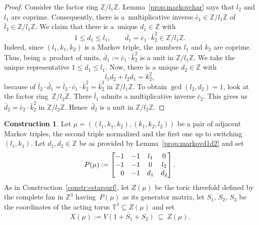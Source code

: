 \documentclass[10pt,a4paper]{amsart}
\theoremstyle{definition}
\newtheorem{constr}[thm]{Construction}
\def\TT{{\mathbb T}}
\def\ZZ{{\mathbb Z}}
\begin{document}
\begin{proof}
Consider the factor ring $\ZZ / l_1\ZZ$.
Lemma~\ref{prop:markovchar} says that
$l_2$ and $l_1$ are coprime.
Consequently, there is a~multiplicative inverse
$\bar c_1 \in \ZZ / l_1\ZZ$ of $\bar l_2 \in \ZZ / l_1\ZZ$.
We claim that there is a~unique $d_1 \in \ZZ$ with
\[
1 \le d_1 \le l_1,
\qquad
\bar d_1 = \bar c_1 \cdot \bar k_2^2 \in \ZZ / l_1\ZZ.
\]
Indeed, since $(l_1,k_1,k_2)$ is a Markov triple,
the numbers $l_1$ and $k_2$ are coprime.
Thus, being a~product of units,
$\bar d_1 := \bar c_1 \cdot \bar k_2^2$
is a unit in $\ZZ / l_1\ZZ$.
We take the unique representative $1 \le d_1 \le l_1$.
Now, there is a unique $d_2 \in \ZZ$ with
\[
l_1d_2 + l_2d_1 = k_2^2,
\]
because of
$\bar l_2 \cdot \bar d_1 = \bar l_2 \cdot \bar c_1 \cdot \bar k_2^2 = \bar k_2^2$
in $\ZZ / l_1\ZZ$.
To obtain $\gcd(l_2,d_2)=1$, look at the factor ring~$\ZZ/l_2\ZZ$.
There $\bar l_1$ admits a multiplicative inverse $\bar c_2$.
This gives us $\bar d_2 = \bar c_2 \cdot \bar k_2^2$ in $\ZZ/l_2\ZZ$.
Hence~$\bar d_2$ is a unit in $\ZZ/l_2\ZZ$.
\end{proof}



\begin{constr}
\label{constr:markovsurface}
Let $\mu = ((l_1,k_1,k_2), (k_1,k_2,l_2))$
be a pair of adjacent Markov triples,
the second triple normalized
and the first one up to switching $(l_1,k_1)$.
Let $d_1, d_2 \in \ZZ$ be as provided
by Lemma~\ref{prop:markovd1d2} and set
\[
P(\mu)
 :=
\begin{bmatrix}
-1 & -1 & l_1 & 0
\\
-1 & -1 & 0 & l_2
\\
\hphantom{-} 0 & -1 & d_1 & d_2
\end{bmatrix}.
\]
As in Construction~\ref{constr:cstarsurf},
let $Z(\mu)$ be the toric threefold defined
by the complete fan in $\ZZ^3$ having~$P(\mu)$
as its generator matrix, let $S_1$, $S_2$, $S_3$ be
the coordinates of the acting torus
$\TT^3 \subseteq Z(\mu)$ and set
\[
X (\mu) := \overline{V(1+S_1+S_2)} \ \subseteq \ Z(\mu).
\]
\end{constr}
\end{document}
